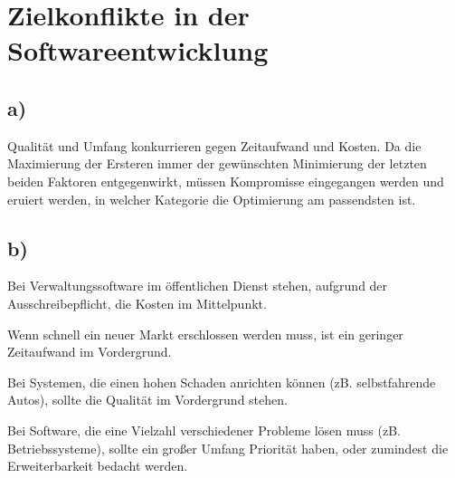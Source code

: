 
\newcommand{\dozent}{Prof. Dr. Agnès Voisard \\ Nicolas Lehmann}					%
\newcommand{\tutor}{Alexander Schulz}						%
\newcommand{\tutoriumNo}{04}				%
\newcommand{\ubungNo}{01}									%
\newcommand{\veranstaltung}{Datenbanksysteme}	%
\newcommand{\semester}{SoSe 18}						%
\newcommand{\studenten}{Mark Niehues}			%



\section{}
\section{Zielkonflikte in der Softwareentwicklung}
\subsection*{a)}
Qualität und Umfang konkurrieren gegen Zeitaufwand und Kosten. Da die Maximierung der Ersteren immer der gewünschten Minimierung der letzten beiden Faktoren entgegenwirkt, müssen Kompromisse eingegangen werden und eruiert werden, in welcher Kategorie die Optimierung am passendsten ist.

\subsection*{b)}
Bei Verwaltungssoftware im öffentlichen Dienst stehen, aufgrund der Ausschreibepflicht, die Kosten im Mittelpunkt.

Wenn schnell ein neuer Markt erschlossen werden muss, ist ein geringer Zeitaufwand im Vordergrund.

Bei Systemen, die einen hohen Schaden anrichten können (zB. selbstfahrende Autos), sollte die Qualität im Vordergrund stehen.

Bei Software, die eine Vielzahl verschiedener Probleme lösen muss (zB. Betriebssysteme), sollte ein großer Umfang Priorität haben, oder zumindest die Erweiterbarkeit bedacht werden.

